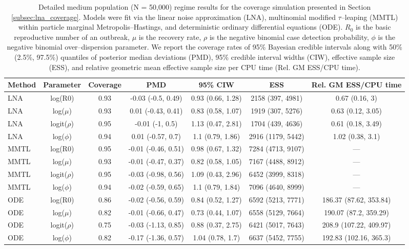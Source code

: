 \begin{sidewaystable}[ht]
	\small
	\centering
	\begin{tabular}{lcccccc}
		\hline
		Method & Parameter & Coverage & PMD & 95\% CIW & ESS & Rel. GM ESS/CPU time \\ 
		\hline
		LNA & log(R0) & 0.93 & -0.03 (-0.5, 0.49) & 0.93 (0.66, 1.28) & 2158 (397, 4981) & 0.67 (0.16, 3) \\ 
		LNA & log($\mu$) & 0.93 & 0.01 (-0.43, 0.41) & 0.83 (0.58, 1.07) & 1919 (307, 5276) & 0.63 (0.12, 3.05) \\ 
		LNA & logit($\rho$) & 0.95 & -0.01 (-1, 0.5) & 1.13 (0.47, 2.81) & 1704 (439, 4636) & 0.61 (0.18, 3.49) \\ 
		LNA & log($\phi$) & 0.94 & 0.01 (-0.57, 0.7) & 1.1 (0.79, 1.86) & 2916 (1179, 5442) & 1.02 (0.38, 3.1) \\ 
		MMTL & log(R0) & 0.95 & -0.01 (-0.46, 0.51) & 0.98 (0.67, 1.32) & 7284 (4713, 9107) & --- \\ 
		MMTL & log($\mu$) & 0.93 & -0.01 (-0.47, 0.37) & 0.82 (0.58, 1.05) & 7167 (4488, 8912) & --- \\ 
		MMTL & logit($\rho$) & 0.95 & -0.03 (-0.98, 0.56) & 1.09 (0.43, 2.96) & 6452 (3999, 8318) & --- \\ 
		MMTL & log($\phi$) & 0.94 & -0.02 (-0.59, 0.65) & 1.1 (0.79, 1.84) & 7096 (4640, 8999) & --- \\ 
		ODE & log(R0) & 0.86 & -0.02 (-0.56, 0.59) & 0.84 (0.52, 1.27) & 6592 (5213, 7771) & 186.37 (87.62, 353.84) \\ 
		ODE & log($\mu$) & 0.82 & -0.01 (-0.66, 0.47) & 0.73 (0.44, 1.07) & 6558 (5129, 7664) & 190.07 (87.2, 359.29) \\ 
		ODE & logit($\rho$) & 0.75 & -0.03 (-1.13, 0.85) & 0.88 (0.37, 2.75) & 6421 (5017, 7643) & 208.9 (107.22, 409.97) \\ 
		ODE & log($\phi$) & 0.82 & -0.17 (-1.36, 0.57) & 1.04 (0.78, 1.7) & 6637 (5452, 7755) & 192.83 (102.16, 365.3) \\ 
		\hline
	\end{tabular}
	\caption{Detailed medium population (N = 50,000) regime results for the coverage simulation presented in Section \ref{subsec:lna_coverage}. Models were fit via the linear noise approximation (LNA), multinomial modified $ \tau $--leaping (MMTL) within particle marginal Metropolis--Hastings, and deterministic ordinary differential equations (ODE). $ R_0 $ is the basic reproductive number of an outbreak, $ \mu $ is the recovery rate, $ \rho $ is the negative binomial case detection probability, $ \phi $ is the negative binomial over--dispersion parameter. We report the coverage rates of 95\% Bayesian credible intervals along with 50\% (2.5\%, 97.5\%) quantiles of posterior median deviations (PMD), 95\% credible interval widths (CIW), effective sample size (ESS), and relative geometric mean effective sample size per CPU time (Rel. GM ESS/CPU time).}
\end{sidewaystable}	

